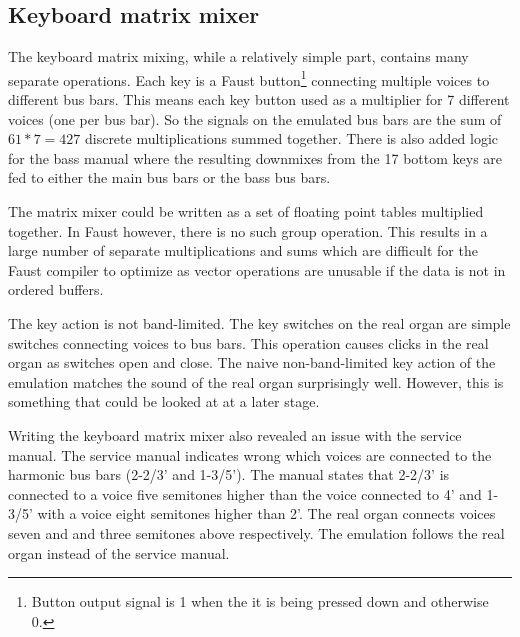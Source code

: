\documentclass[11pt,a4paper]{article}
\begin{document}



\subsection{Keyboard matrix mixer}

The keyboard matrix mixing, while a relatively simple part, contains many separate operations. Each key is a Faust button\footnote{Button output signal is 1 when the it is being pressed down and otherwise 0.} connecting multiple voices to different bus bars. This means each key button used as a multiplier for 7 different voices (one per bus bar). So the signals on the emulated bus bars are the sum of $61*7 = 427$ discrete multiplications summed together. There is also added logic for the bass manual where the resulting downmixes from the 17 bottom keys are fed to either the main bus bars or the bass bus bars.

The matrix mixer could be written as a set of floating point tables multiplied together. In Faust however, there is no such group operation. This results in a large number of separate multiplications and sums which are difficult for the Faust compiler to optimize as vector operations are unusable if the data is not in ordered buffers.

The key action is not band-limited. The key switches on the real organ are simple switches connecting voices to bus bars. This operation causes clicks in the real organ as switches open and close. The naive non-band-limited key action of the emulation matches the sound of the real organ surprisingly well. However, this is something that could be looked at at a later stage.

Writing the keyboard matrix mixer also revealed an issue with the service manual. The service manual indicates wrong which voices are connected to the harmonic bus bars (2-2/3' and 1-3/5'). The manual states that 2-2/3' is connected to a voice five semitones higher than the voice connected to 4' and 1-3/5' with a voice eight semitones higher than 2'. The real organ connects voices seven and and three semitones above respectively. The emulation follows the real organ instead of the service manual.
\end{document}

